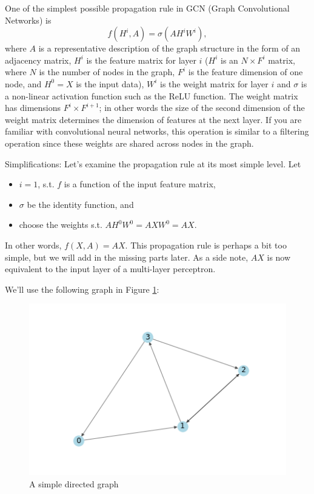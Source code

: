 \documentclass{article}
\begin{document}
One of the simplest possible propagation rule in GCN (Graph Convolutional Networks) is
\begin{equation}
  f(H^i, A) = \sigma(A H^i W^i),
\end{equation}
where $A$ is  a representative description of the graph structure in the form of an adjacency matrix, $H^i$ is the feature matrix for layer $i$ ($H^i$ is an $N \times F^{i}$ matrix, where $N$ is the number of nodes in the graph, $F^i$ is the feature dimension of one node, and $H^0 = X$ is the input data), $W^i$ is the weight matrix for layer $i$ and $\sigma$ is a non-linear activation function such as the ReLU function. The weight matrix has dimensions $F^i \times F^{i+1}$; in other words the size of the second dimension of the weight matrix determines the dimension of features at the next layer. If you are familiar with convolutional neural networks, this operation is similar to a filtering operation since these weights are shared across nodes in the graph.

Simplifications: Let's examine the propagation rule at its most simple level. Let
\begin{itemize}
    \item $i = 1$, s.t. $f$ is a function of the input feature matrix,
    \item $\sigma$ be the identity function, and
    \item choose the weights s.t. $AH^0W^0 = AXW^0 = AX$.
\end{itemize}

In other words, $f(X, A) = AX$. This propagation rule is perhaps a bit too simple, but we will add in the missing parts later. As a side note, $AX$ is now equivalent to the input layer of a multi-layer perceptron.

We'll use the following graph in Figure \ref{fig:2_1}:
\begin{figure}[ht]
    \centering
    \includegraphics[scale=0.6]{graph.png}
    \caption{A simple directed graph}
    \label{fig:2_1}
\end{figure}
\end{document}
